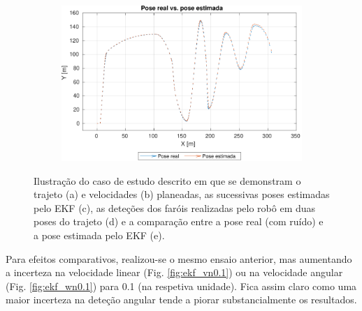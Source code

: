 \documentclass{article}
\begin{document}
\begin{figure}[ht]
     \begin{subfigure}[b]{0.49\textwidth}
         \centering
         \includegraphics[width=\textwidth]{figs/pose_compare.pdf}
         \caption{}
         \label{fig:ekf_real_compare}
     \end{subfigure}
     \caption{Ilustração do caso de estudo descrito em que se demonstram o trajeto (a) e velocidades (b) planeadas, as sucessivas poses estimadas pelo EKF (c), as deteções dos faróis realizadas pelo robô em duas poses do trajeto (d) e a comparação entre a pose real (com ruído) e a pose estimada pelo EKF (e).}
     \label{fig:planning}
\end{figure}

Para efeitos comparativos, realizou-se o mesmo ensaio anterior, mas aumentando a incerteza na velocidade linear (Fig. \ref{fig:ekf_vn0.1}) ou na velocidade angular (Fig. \ref{fig:ekf_wn0.1}) para 0.1 (na respetiva unidade). Fica assim claro como uma maior incerteza na deteção angular tende a piorar substancialmente os resultados.
\end{document}
